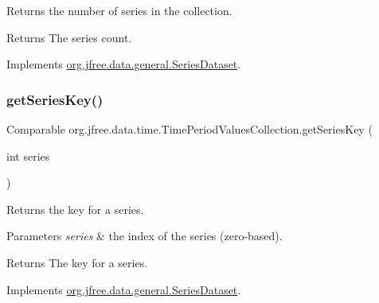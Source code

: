 Returns the number of series in the collection.

\begin{DoxyReturn}{Returns}
The series count. 
\end{DoxyReturn}


Implements \mbox{\hyperlink{interfaceorg_1_1jfree_1_1data_1_1general_1_1_series_dataset_a84fe822f5918f941d9de1ed1b73c9f58}{org.\+jfree.\+data.\+general.\+Series\+Dataset}}.

\mbox{\label{classorg_1_1jfree_1_1data_1_1time_1_1_time_period_values_collection_a432f205f15ffa8b9aacbcb4c77e5afd3}} 
\subsubsection{\texorpdfstring{get\+Series\+Key()}{getSeriesKey()}}
{\footnotesize\ttfamily Comparable org.\+jfree.\+data.\+time.\+Time\+Period\+Values\+Collection.\+get\+Series\+Key (\begin{DoxyParamCaption}\item[{int}]{series }\end{DoxyParamCaption})}

Returns the key for a series.


\begin{DoxyParams}{Parameters}
{\em series} & the index of the series (zero-\/based).\\
\hline
\end{DoxyParams}
\begin{DoxyReturn}{Returns}
The key for a series. 
\end{DoxyReturn}


Implements \mbox{\hyperlink{interfaceorg_1_1jfree_1_1data_1_1general_1_1_series_dataset_a60488892b2314a05a012999e26a74178}{org.\+jfree.\+data.\+general.\+Series\+Dataset}}.

\mbox{\label{classorg_1_1jfree_1_1data_1_1time_1_1_time_period_values_collection_aa36a15fdb6ff28968edd997f317c27c5}} 

